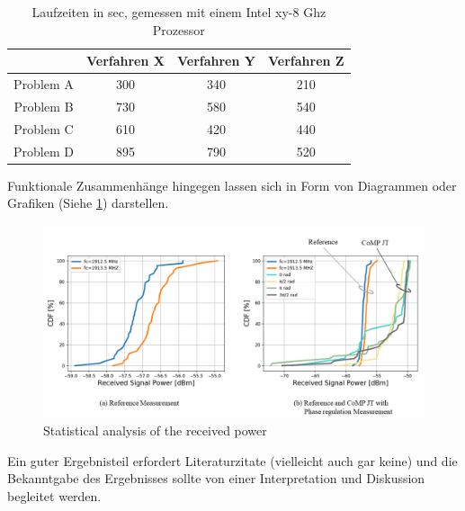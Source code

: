 \begin{table}[h!]
	\begin{center}
        \caption{Laufzeiten in sec, gemessen mit einem Intel xy-8 Ghz Prozessor}\label{TabLaufzeiten}
		\begin{tabular}{|c||c|c|c|}
			\hline 
			& Verfahren X & Verfahren Y & Verfahren Z \\ 
			\hline 
			\hline 
			\hspace{.1cm}
			Problem A & 300 & 340 & 210 \\ 
			\hline 
			\hspace{.1cm}
			Problem B & 730 & 580 & 540 \\ 
			\hline 
			\hspace{.1cm}
			Problem C & 610 & 420 & 440 \\ 
			\hline 
			\hspace{.1cm}
			Problem D & 895 & 790 & 520 \\ 
			\hline 
		\end{tabular} 
	\end{center}
\end{table}


Funktionale Zusammenhänge hingegen lassen sich in Form von Diagrammen oder Grafiken (Siehe \ref{fig:Abbildung1}) darstellen.


\begin{figure}[!htb]
	\centering
	\includegraphics[width=1\textwidth]{Bilder/Abbildung1}
	\caption{Statistical analysis of the received power}
	\label{fig:Abbildung1}
\end{figure}

Ein guter Ergebnisteil erfordert Literaturzitate (vielleicht auch gar keine) und die Bekanntgabe des Ergebnisses sollte von einer Interpretation und Diskussion begleitet werden. 


\newpage

